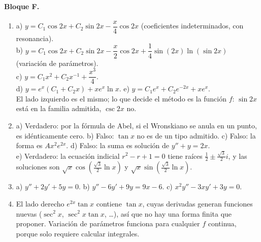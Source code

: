 {\paragraph{Bloque F.}
\begin{enumerate}[label=\textbf{F\arabic*.}, leftmargin=*]
    \item a) $y=C_1\cos2x+C_2\sin2x-\dfrac{x}{4}\cos2x$ (coeficientes indeterminados, con resonancia).\\
    b) $y=C_1\cos2x+C_2\sin2x-\dfrac{x}{2}\cos2x+\dfrac14\sin(2x)\ln(\sin2x)$ (variaci\'on de par\'ametros).\\
    c) $y=C_1x^2+C_2x^{-1}+\dfrac{x^3}{4}$.\\ d) $y=e^x\left(C_1+C_2x\right)+xe^x\ln x$. \quad e) $y=C_1e^x+C_2e^{-2x}+xe^x$.\\
    El lado izquierdo es el mismo; lo que decide el m\'etodo es la funci\'on $f$: $\sin 2x$ est\'a en la familia admitida, $\csc 2x$ no.
    \item a) Verdadero: por la f\'ormula de Abel, si el Wronskiano se anula en un punto, es id\'enticamente cero. \quad b) Falso: $\tan x$ no es de un tipo admitido. \quad c) Falso: la forma es $Ax^2e^{2x}$. \quad d) Falso: la suma es soluci\'on de $y''+y=2x$.\\ e) Verdadero: la ecuaci\'on indicial $r^2-r+1=0$ tiene ra\'ices $\frac12\pm\frac{\sqrt3}{2}i$, y las soluciones son $\sqrt{x}\cos\left(\frac{\sqrt3}{2}\ln x\right)$ y $\sqrt{x}\sin\left(\frac{\sqrt3}{2}\ln x\right)$.
    \item a) $y''+2y'+5y=0$. \quad b) $y''-6y'+9y=9x-6$. \quad c) $x^2y''-3xy'+3y=0$.
    \item El lado derecho $e^{2x}\tan x$ contiene $\tan x$, cuyas derivadas generan funciones nuevas ($\sec^2x$, $\sec^2x\tan x$, \ldots), as\'i que no hay una forma finita que proponer. Variaci\'on de par\'ametros funciona para cualquier $f$ continua, porque solo requiere calcular integrales.
\end{enumerate}

}

